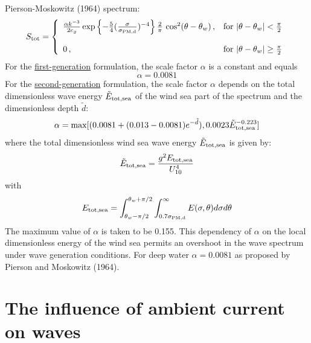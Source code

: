 \documentclass[12pt]{book}
\begin{document}
Pierson-Moskowitz (1964) spectrum:
\begin{equation}
   S_{\rm tot} =
    \left\{
      \begin{array}{ll}
         \frac{\alpha k^{-3}}{2c_g} \exp{ \left \{ -\frac{5}{4}(\frac{\sigma}{\sigma_{\rm PM,d}})^{-4} \right\} }
         \, \frac{2}{\pi} \, \cos^2(\theta-\theta_w)
         \, , & \mbox{for } |\theta - \theta_w| < \frac{\pi}{2} \\
         \\
         0 \, , & \mbox{for } |\theta - \theta_w| \geq \frac{\pi}{2} \\
      \end{array}
    \right.
\end{equation}
For the \underline{first-generation} formulation, the scale factor $\alpha$ is a constant and equals
\begin{equation}
  \alpha = 0.0081
\end{equation}
For the \underline{second-generation} formulation, the scale factor $\alpha$ depends on the total dimensionless
wave energy ${\tilde E}_{\rm tot,sea}$ of the wind sea part of the spectrum and the dimensionless depth ${\tilde d}$:
\begin{equation}
  \alpha = \max [ (0.0081 + (0.013 - 0.0081)e^{-{\tilde d}}), 0.0023 {\tilde E}^{-0.223}_{\rm tot,sea} ]
\end{equation}
where the total dimensionless wind sea wave energy ${\tilde E}_{\rm tot,sea}$ is given by:
\begin{equation}
  {\tilde E}_{\rm tot,sea} = \frac{g^2 E_{\rm tot,sea}}{U^4_{10}}
\end{equation}
with
\begin{equation}
  E_{\rm tot,sea} = \int_{\theta_w - \pi/2}^{\theta_w + \pi/2} \int_{0.7 \sigma_{\rm PM,d}}^{\infty}
  E(\sigma,\theta) d\sigma d\theta
\end{equation}
The maximum value of $\alpha$ is taken to be 0.155. This dependency of $\alpha$ on the local
dimensionless energy of the wind sea permits an overshoot in the wave spectrum under wave
generation conditions. For deep water $\alpha = 0.0081$ as proposed by Pierson and Moskowitz (1964).

\section{The influence of ambient current on waves} \label{sec:curre}
\end{document}
